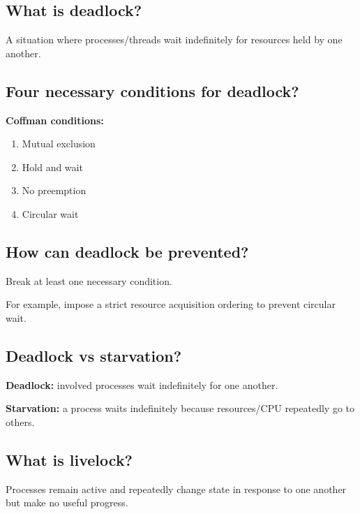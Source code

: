 \subsection{What is deadlock?}

A situation where processes/threads wait indefinitely for resources held by one another.

\medskip

\subsection{Four necessary conditions for deadlock?}

\textbf{Coffman conditions:}

\begin{enumerate}
  \item Mutual exclusion
  \item Hold and wait
  \item No preemption
  \item Circular wait
\end{enumerate}

\medskip

\subsection{How can deadlock be prevented?}

Break at least one necessary condition.

For example, impose a strict resource acquisition ordering to prevent circular wait.

\medskip

\subsection{Deadlock vs starvation?}

\textbf{Deadlock:} involved processes wait indefinitely for one another.

\textbf{Starvation:} a process waits indefinitely because resources/CPU repeatedly go to others.

\medskip

\subsection{What is livelock?}

Processes remain active and repeatedly change state in response to one another but make no useful progress.

